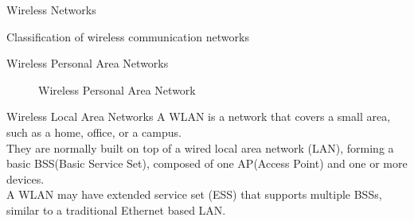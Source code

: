\begin{section}{Wireless Networks}
\begin{subsection}{Classification of wireless communication networks}
\begin{subsubsection}{Wireless Personal Area Networks}
\begin{figure}
        \caption{Wireless Personal Area Network}
      \end{figure}
    \end{subsubsection}
    \begin{subsubsection}{Wireless Local Area Networks}
      A WLAN is a network that covers a small area, such as a home, office, or a campus.\\
      They are normally built on top of a wired local area network (LAN), forming a basic 
      BSS(Basic Service Set), composed of one AP(Access Point) and one or more devices.\\
      A WLAN may have extended service set (ESS) that supports multiple BSSs, similar to a 
      traditional Ethernet based LAN.
    \end{subsubsection}

  \end{subsection}
\end{section}

